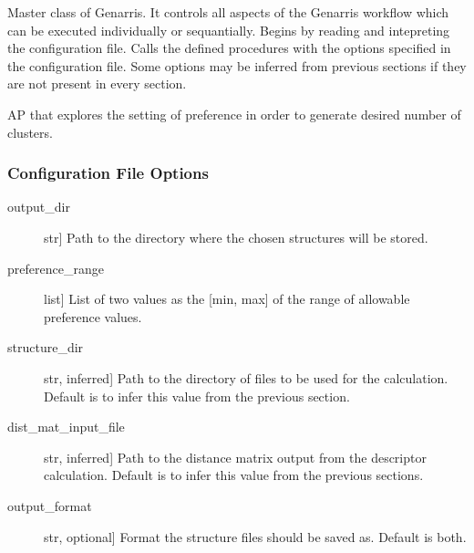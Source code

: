 \documentclass[letterpaper,10pt,english]{sphinxmanual}
\begin{document}
\begin{fulllineitems}
\label{\detokenize{index:Genarris.genarris_master.Genarris}}
Master class of Genarris. It controls all aspects of the
Genarris workflow which can be executed individually or sequantially.
Begins by reading and intepreting the configuration file.
Calls the defined procedures with the options specified in the
configuration file. Some options may be inferred from previous sections
if they are not present in every section.

\begin{fulllineitems}
\label{\detokenize{index:Genarris.genarris_master.Genarris.Affinity_Propagation_Fixed_Clusters}}
AP that explores the setting of preference in order to generate
desired number of clusters.
\subsubsection*{Configuration File Options}
\begin{description}
\item[{output\_dir}] \leavevmode{[}str{]}
Path to the directory where the chosen structures will be stored.

\item[{preference\_range}] \leavevmode{[}list{]}
List of two values as the {[}min, max{]} of the range of allowable
preference values.

\item[{structure\_dir}] \leavevmode{[}str, inferred{]}
Path to the directory of files to be used for the calculation.
Default is to infer this value from the previous section.

\item[{dist\_mat\_input\_file}] \leavevmode{[}str, inferred{]}
Path to the distance matrix output from the descriptor calculation.
Default is to infer this value from the previous sections.

\item[{output\_format}] \leavevmode{[}str, optional{]}
Format the structure files should be saved as. Default is both.


\end{description}
\end{fulllineitems}
\end{fulllineitems}
\end{document}
